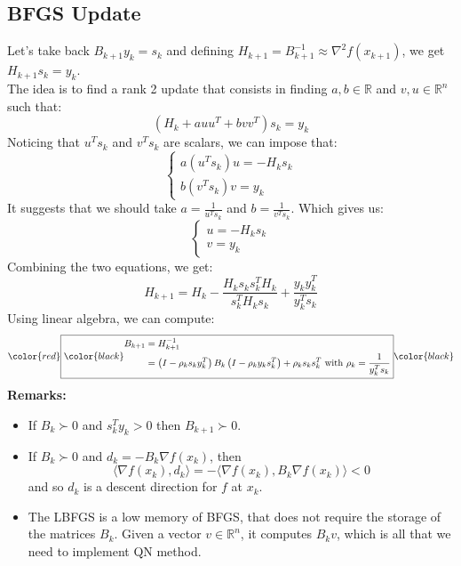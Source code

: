 \documentclass[12pt, openany]{report}
\newcommand{\R}{\mathbb{R}}
\theoremstyle{definition}
\begin{document}
\subsection{BFGS Update}
Let's take back $B_{k+1} y_k = s_k$ and defining $H_{k+1} = B_{k+1}^{-1} \approx \nabla^2 f(x_{k+1})$, we get $H_{k+1} s_k = y_k$.\\
The idea is to find a rank 2 update that consists in finding $a,b \in \R$ and $v,u \in \R^n$ such that:
\begin{equation}\label{eq:rank2_update_idea}
	\left(H_k + a uu^T + b vv^T\right)s_k = y_k
\end{equation}
Noticing that $u^Ts_k$ and $v^Ts_k$ are scalars, we can impose that:
\begin{equation}
	\begin{cases}
		a(u^Ts_k) u = -H_ks_k\\
		b(v^Ts_k) v = y_k
	\end{cases}
\end{equation}
It suggests that we should take $a= \frac{1}{u^Ts_k}$ and $b = \frac{1}{v^Ts_k}$. Which gives us:
\begin{equation}
	\begin{cases}
		u = -H_ks_k\\
		v = y_k
	\end{cases}
\end{equation}
Combining the two equations, we get:
\begin{equation}
	H_{k+1} = H_k - \frac{H_ks_ks_k^TH_k}{s_k^TH_ks_k} + \frac{y_ky_k^T}{y_k^Ts_k}
\end{equation}
Using linear algebra, we can compute:\\
\begin{equation}\label{eq:BFGS_update}
	\color{red}
	\boxed{
	\color{black}
	\begin{aligned}
		B_{k+1} &= H_{k+1}^{-1}\\
		&= \left(I-\rho_ks_ky_k^T\right) B_k \left(I-\rho_ky_ks_k^T\right) + \rho_k s_k s_k^T \text{ with } \rho_k = \frac{1}{y_k^Ts_k}
	\end{aligned}}
	\color{black}
\end{equation}
\textbf{Remarks:}
\begin{itemize}
	\item If $B_k \succ 0$ and $s_k^Ty_k > 0$ then $B_{k+1} \succ 0$.
	\item If $B_k \succ 0$ and $d_k = - B_k \nabla f(x_k)$, then 
	\begin{equation}
		\langle \nabla f(x_k), d_k \rangle = - \langle \nabla f(x_k), B_k \nabla f(x_k) \rangle < 0
	\end{equation}
	and so $d_k$ is a descent direction for $f$ at $x_k$.
	\item The LBFGS is a low memory of BFGS, that does not require the storage of the matrices $B_k$. Given a vector $v \in \R^n$, it computes $B_kv$, which is all that we need to implement QN method.
\end{itemize}
\end{document}
